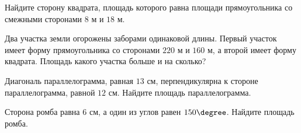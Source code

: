 %
%

\begin{class}[number=1]
	\begin{listofex}
		\item Найдите сторону квадрата, площадь которого равна площади прямоугольника со смежными сторонами \(8\) м и \(18\) м. %
		\item Два участка земли огорожены заборами одинаковой длины. Первый участок имеет форму прямоугольника со сторонами \(220\) м и \(160\) м, а второй имеет форму квадрата. Площадь какого участка больше и на сколько? %
		\item Диагональ параллелограмма, равная \(13\) см, перпендикулярна к стороне параллелограмма, равной \(12\) см. Найдите площадь параллелограмма. %
		\item Сторона ромба равна \(6\) см, а один из углов равен \(150 \degree\). Найдите площадь ромба.
	\end{listofex}
\end{class}


